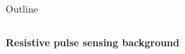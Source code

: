 \begin{frame}[c]{Outline}
\begin{columns}[t]
\begin{column}[T]{2.25in}
			
			


			
			
		\end{column}
		
	\end{columns}

	
	
	
	
	
\end{frame}




\begin{frame}[c]{}
	\begin{center}
		\textbf{Resistive pulse sensing background}
	\end{center}
\end{frame}





